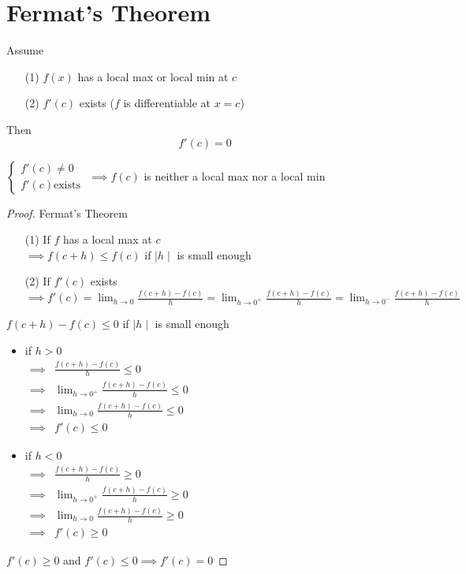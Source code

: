 \section{Fermat's Theorem}
\begin{theorem}
Assume
\begin{itemize}
\item[(1)] $f(x)$ has a local max or local min at $c$
\item[(2)] $f'(c)$ exists ($f$ is differentiable at $x = c$)
\end{itemize}
Then
$$f'(c) = 0$$
\end{theorem}
\begin{notn}
$\left\{ \begin{array}{ll}
           f'(c) \neq 0 \\
           f'(c) \text{exists}
        \end{array} \right.
$ $\implies f(c)$ is neither a local max nor a local min
\end{notn}
\begin{proof}
Fermat's Theorem
\begin{itemize}
\item[(1)] If $f$ has a local max at $c$\\
$\implies f(c+h) \leq f(c)$ if  $\mid h \mid$ is small enough
\item[(2)] If $f'(c)$ exists\\
$\implies \displaystyle f'(c) = \lim_{h \to 0} \frac{f(c+h)-f(c)}{h} = \lim_{h \to 0^+} \frac{f(c+h)-f(c)}{h} = \lim_{h \to 0^-} \frac{f(c+h)-f(c)}{h}$
\end{itemize}
$f(c+h) - f(c) \leq 0$ if $\mid h \mid$ is small enough
\begin{itemize}
\item if $h > 0$\\
$\begin{array}{rcl}
\implies & \displaystyle \frac{f(c+h) -f(c)}{h} \leq 0\\
\implies & \displaystyle \lim_{h \to 0^+} \frac{f(c+h) -f(c)}{h} \leq 0\\
\implies & \displaystyle \lim_{h \to 0} \frac{f(c+h) -f(c)}{h} \leq 0\\
\implies & f'(c) \leq 0
\end{array}$
\item if $h < 0$\\
$\begin{array}{rcl}
\implies & \displaystyle \frac{f(c+h) -f(c)}{h} \geq 0\\
\implies & \displaystyle \lim_{h \to 0^+} \frac{f(c+h) -f(c)}{h} \geq 0\\
\implies & \displaystyle \lim_{h \to 0} \frac{f(c+h) -f(c)}{h} \geq 0\\
\implies & f'(c) \geq 0
\end{array}$\\
\end{itemize}
$f'(c) \geq 0$ and $f'(c) \leq 0 \implies f'(c) =0$
\end{proof}

